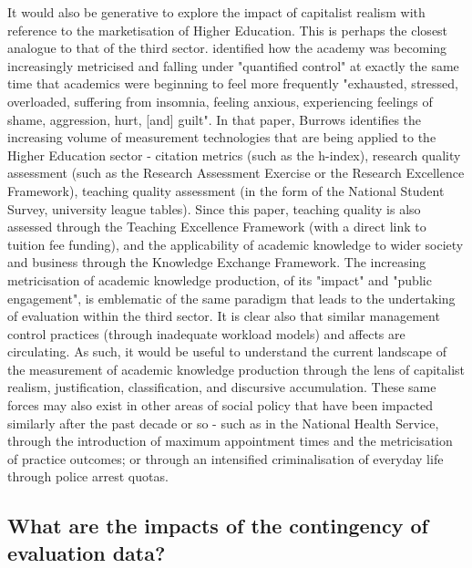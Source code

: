 It would also be generative to explore the impact of capitalist realism with reference to the marketisation of Higher Education. This is perhaps the closest analogue to that of the third sector. \citet[355]{burrows_living_2012} identified how the academy was becoming increasingly metricised and falling under "quantified control" at exactly the same time that academics were beginning to feel more frequently "exhausted, stressed, overloaded, suffering from insomnia, feeling anxious, experiencing feelings of shame, aggression, hurt, [and] guilt". In that paper, Burrows identifies the increasing volume of measurement technologies that are being applied to the Higher Education sector - citation metrics (such as the h-index), research quality assessment (such as the Research Assessment Exercise or the Research Excellence Framework), teaching quality assessment (in the form of the National Student Survey, university league tables). Since this paper, teaching quality is also assessed through the Teaching Excellence Framework (with a direct link to tuition fee funding), and the applicability of academic knowledge to wider society and business through the Knowledge Exchange Framework. The increasing metricisation of academic knowledge production, of its "impact" and "public engagement", is emblematic of the same paradigm that leads to the undertaking of evaluation within the third sector. It is clear also that similar management control practices (through inadequate workload models) and affects are circulating. As such, it would be useful to understand the current landscape of the measurement of academic knowledge production through the lens of capitalist realism, justification, classification, and discursive accumulation. These same forces may also exist in other areas of social policy that have been impacted similarly after the past decade or so - such as in the National Health Service, through the introduction of maximum appointment times and the metricisation of practice outcomes; or through an intensified criminalisation of everyday life through police arrest quotas. 

\subsection{What are the impacts of the contingency of evaluation data?}

